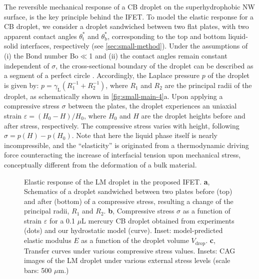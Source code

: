 The reversible mechanical response of a CB droplet on the
superhydrophobic NW surface, is the key principle behind the IFET.
%
To model the elastic response for a CB droplet, we consider a droplet
sandwiched between two flat plates, with two apparent contact angles
\(\theta_{\mathrm{t}}^{*}\) and \(\theta_{\mathrm{b}}^{*}\),
corresponding to the top and bottom liquid-solid interfaces,
respectively (see \autoref{sec:small-method}). Under the assumptions
of (i) the Bond number Bo\(\ll\)1 and (ii) the contact angles remain
constant independent of \(\sigma\), the cross-sectional boundary of
the droplet can be described as a segment of a perfect circle
\cite{berthier_2012_microdroplet}. Accordingly, the Laplace pressure
\(p\) of the droplet is given by:
\(p = \gamma_{\mathrm{L}} (R_{1}^{-1} + R_{2}^{-1})\), where \(R_{1}\)
and \(R_{2}\) are the principal radii of the droplet, as schematically
shown in \autoref{fig:small-main-4}a. Upon applying a compressive
stress \(\sigma\) between the plates, the droplet experiences an
uniaxial strain \(\varepsilon = (H_{0} - H) / H_{0}\), where \(H_{0}\)
and \(H\) are the droplet heights before and after stress,
respectively. The compressive stress varies with height, following
\(\sigma = p(H) - p(H_{0})\). Note that here the liquid phase itself
is nearly incompressible, and the ``elasticity'' is originated from a
thermodynamic driving force counteracting the increase of interfacial
tension upon mechanical stress, conceptually different from the
deformation of a bulk material.
\begin{figure}[!htbp]
  \centering
  \caption{\label{fig:small-main-4} Elastic response of the LM droplet
    in the proposed IFET. \textbf{a}, Schematics of a droplet
    sandwiched between two plates before (top) and after (bottom) of a
    compressive stress, resulting a change of the principal radii,
    \(R_{1}\) and \(R_{2}\). \textbf{b}, Compressive stress \(\sigma\)
    as a function of strain \(\varepsilon\) for a 0.1 \(\mu\)L mercury
    CB droplet obtained from experiments (dots) and our hydrostatic
    model (curve). Inset: model-predicted elastic modulus \(E\) as a
    function of the droplet volume \(V_{\mathrm{drop}}\). \textbf{c},
    Transfer curves under various compressive stress values. Insets:
    CAG images of the LM droplet under various external stress levels
    (scale bars: 500 \(\mu\)m.)}
\end{figure}

